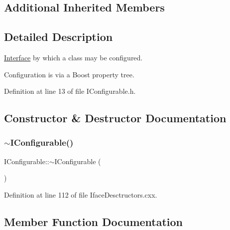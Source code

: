\subsection*{Additional Inherited Members}


\subsection{Detailed Description}
\hyperlink{class_wire_cell_1_1_interface}{Interface} by which a class may be configured.

Configuration is via a Boost property tree. 

Definition at line 13 of file I\+Configurable.\+h.



\subsection{Constructor \& Destructor Documentation}
\mbox{\label{class_wire_cell_1_1_i_configurable_a077835c4ce9cf9ed14f3a573570d6efb}} 
\subsubsection{\texorpdfstring{$\sim$\+I\+Configurable()}{~IConfigurable()}}
{\footnotesize\ttfamily I\+Configurable\+::$\sim$\+I\+Configurable (\begin{DoxyParamCaption}{ }\end{DoxyParamCaption})\hspace{0.3cm}{\ttfamily [virtual]}}



Definition at line 112 of file Iface\+Desctructors.\+cxx.



\subsection{Member Function Documentation}
\mbox{\label{class_wire_cell_1_1_i_configurable_a57ff687923a724093df3de59c6ff237d}} 
